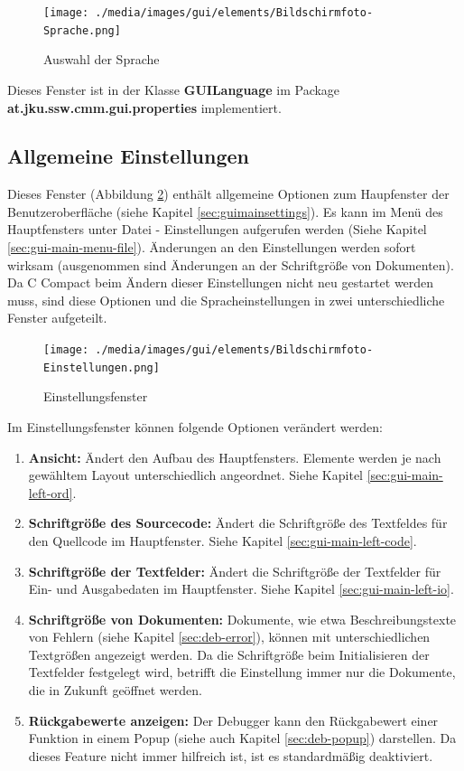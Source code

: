 \begin{figure}[htp]
\centering
\texttt{[image: ./media/images/gui/elements/Bildschirmfoto-Sprache.png]}
\caption{Auswahl der Sprache}
\label{fig:win-lang}
\end{figure}

Dieses Fenster ist in der Klasse \textbf{GUILanguage} im Package \textbf{at.jku.ssw.cmm.gui.properties} implementiert. 

\subsection{Allgemeine Einstellungen}
\label{sec:win-set}
Dieses Fenster (Abbildung \ref{fig:win-set}) enthält allgemeine Optionen zum Haupfenster der Benutzeroberfläche (siehe Kapitel \ref{sec:guimainsettings}). Es kann im Menü des Hauptfensters unter \glqq{}Datei\grqq{} - \glqq{}Einstellungen\grqq{} aufgerufen werden (Siehe Kapitel \ref{sec:gui-main-menu-file}). Änderungen an den Einstellungen werden sofort wirksam (ausgenommen sind Änderungen an der Schriftgröße von Dokumenten). Da C Compact beim Ändern dieser Einstellungen nicht neu gestartet werden muss, sind diese Optionen und die Spracheinstellungen in zwei unterschiedliche Fenster aufgeteilt.

\begin{figure}[htp]
\centering
\texttt{[image: ./media/images/gui/elements/Bildschirmfoto-Einstellungen.png]}
\caption{Einstellungsfenster}
\label{fig:win-set}
\end{figure}

Im Einstellungsfenster können folgende Optionen verändert werden:
\begin{enumerate}
\item \textbf{Ansicht:} Ändert den Aufbau des Hauptfensters. Elemente werden je nach gewähltem Layout unterschiedlich angeordnet. Siehe Kapitel \ref{sec:gui-main-left-ord}.
\item \textbf{Schriftgröße des Sourcecode:} Ändert die Schriftgröße des Textfeldes für den Quellcode im Hauptfenster. Siehe Kapitel \ref{sec:gui-main-left-code}.
\item \textbf{Schriftgröße der Textfelder:} Ändert die Schriftgröße der Textfelder für Ein- und Ausgabedaten im Hauptfenster. Siehe Kapitel \ref{sec:gui-main-left-io}.
\item \textbf{Schriftgröße von Dokumenten:} Dokumente, wie etwa Beschreibungstexte von Fehlern (siehe Kapitel \ref{sec:deb-error}), können mit unterschiedlichen Textgrößen angezeigt werden. Da die Schriftgröße beim Initialisieren der Textfelder festgelegt wird, betrifft die Einstellung immer nur die Dokumente, die in Zukunft geöffnet werden.
\item \textbf{Rückgabewerte anzeigen:} Der Debugger kann den Rückgabewert einer Funktion in einem Popup (siehe auch Kapitel \ref{sec:deb-popup}) darstellen. Da dieses Feature nicht immer hilfreich ist, ist es standardmäßig deaktiviert.
\end{enumerate}

